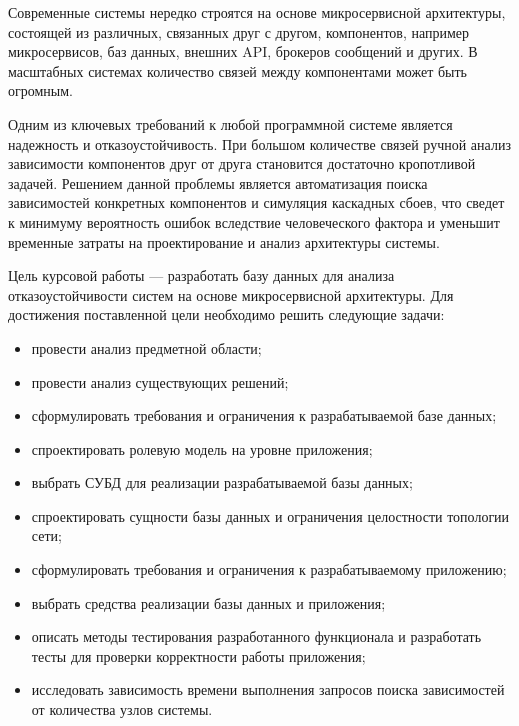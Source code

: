 
Современные системы нередко строятся на основе микросервисной архитектуры,
состоящей из различных, связанных друг с другом, компонентов, например
микросервисов, баз данных, внешних API, брокеров сообщений и других.
В масштабных системах количество связей между компонентами может быть огромным.

Одним из ключевых требований к любой программной системе является надежность
и отказоустойчивость. При большом количестве связей ручной анализ зависимости
компонентов друг от друга становится достаточно кропотливой задачей.
Решением данной проблемы является автоматизация поиска зависимостей конкретных
компонентов и симуляция каскадных сбоев, что сведет к минимуму вероятность ошибок
вследствие человеческого фактора и уменьшит временные затраты на проектирование
и анализ архитектуры системы.

Цель курсовой работы --- разработать базу данных для анализа отказоустойчивости
систем на основе микросервисной архитектуры.
Для достижения поставленной цели необходимо решить следующие задачи:
\begin{itemize}
    \item провести анализ предметной области;
    \item провести анализ существующих решений;
    \item сформулировать требования и ограничения к разрабатываемой базе данных;
    \item спроектировать ролевую модель на уровне приложения;
    \item выбрать СУБД для реализации разрабатываемой базы данных;
    \item спроектировать сущности базы данных и ограничения целостности топологии сети;
    \item сформулировать требования и ограничения к разрабатываемому приложению;
    \item выбрать средства реализации базы данных и приложения;
    \item описать методы тестирования разработанного функционала и разработать тесты
        для проверки корректности работы приложения;
    \item исследовать зависимость времени выполнения запросов поиска зависимостей
        от количества узлов системы.
\end{itemize}
